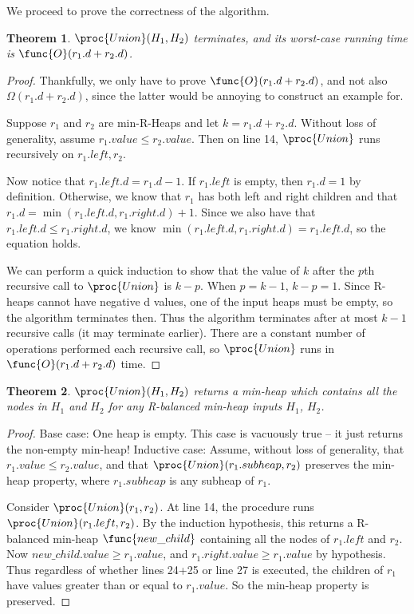 \documentclass[11pt, answers]{exam}
\theoremstyle{plain}
\newtheorem{theorem}{Theorem}
\theoremstyle{definition}
\begin{document}
\begin{questions}
\begin{parts}
\begin{solution}
We proceed to prove the correctness of the algorithm. \\

\begin{theorem}
$\proc{Union}(H_1, H_2)$ terminates, and its worst-case running time is $\func{O}(r_1 .d + r_2 .d)$.
\end{theorem}

\begin{proof}
Thankfully, we only have to prove $\func{O}(r_1 .d + r_2 .d)$, and not also $\Omega(r_1 .d + r_2 .d)$, since the latter would be annoying to construct an example for. 

Suppose $r_1$ and $r_2$ are min-R-Heaps and let $k = r_1 .d + r_2 .d$. Without loss of generality, assume $r_1.value \leq r_2.value$. Then on line 14, $\proc{Union}$ runs recursively on $r_1.left, r_2$. 

Now notice that $r_1.left.d = r_1.d - 1$. If $r_1.left$ is empty, then $r_1.d = 1$ by definition. Otherwise, we know that $r_1$ has both left and right children and that $r_1.d = \min(r_1.left.d, r_1.right.d) + 1$. Since we also have that $r_1.left.d  \leq r_1.right.d$, we know
$\min(r_1.left.d, r_1.right.d) = r_1.left.d$, so the equation holds.

We can perform a quick induction to show that the value of $k$ after the $p$th recursive call to $\proc{Union}$ is $k-p$. When $p = k-1$, $k-p = 1$. Since R-heaps cannot have negative d values, one of the input heaps must be empty, so the algorithm terminates then. Thus the algorithm terminates after at most $k-1$ recursive calls (it may terminate earlier). There are a constant number of operations performed each recursive call, so $\proc{Union}$ runs in $\func{O}(r_1 .d + r_2 .d)$ time.
\end{proof}

\begin{theorem}
$\proc{Union}(H_1, H_2)$ returns a min-heap which contains all the nodes in $H_1$ and $H_2$ for any R-balanced min-heap inputs $H_1$, $H_2$.
\end{theorem}

\begin{proof}
Base case: One heap is empty. This case is vacuously true -- it just returns the non-empty min-heap!
Inductive case: Assume, without loss of generality, that $r_1.value \leq r_2.value$, and that $\proc{Union}(r_1.subheap, r_2)$ preserves the min-heap property, where $r_1.subheap$ is any subheap of $r_1$.

Consider $\proc{Union}(r_1, r_2)$. At line 14, the procedure runs $\proc{Union}(r_1.left, r_2)$. By the induction hypothesis, this returns a R-balanced min-heap $\func{new\_child}$ containing all the nodes of $r_1.left$ and $r_2$. Now $new\_child.value \geq r_1.value$, and $r_1.right.value \geq r_1.value$ by hypothesis. Thus regardless of whether lines 24+25 or line 27 is executed, the children of $r_1$ have values greater than or equal to $r_1.value$. So the min-heap property is preserved.


\end{proof}
\end{solution}
\end{parts}
\end{questions}
\end{document}

